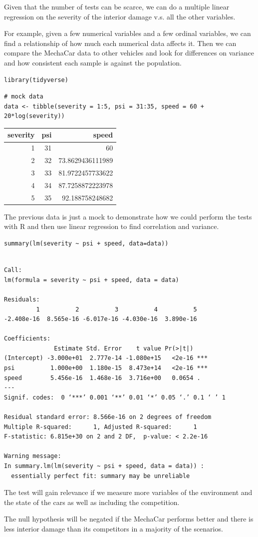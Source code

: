 \documentclass[11pt]{article}
\begin{document}
Given that the number of tests can be scarce, we can do a multiple linear regression on the severity of the interior damage v.s. all the other variables.

For example, given a few numerical variables and a few ordinal variables, we can find a relationship of how much each numerical data affects it. Then we can compare the MechaCar data to other vehicles and look for differences on variance and how consistent each sample is against the population.

\begin{verbatim}
library(tidyverse)
\end{verbatim}

\begin{verbatim}
# mock data
data <- tibble(severity = 1:5, psi = 31:35, speed = 60 + 20*log(severity))
\end{verbatim}

\begin{org}
\begin{center}
\begin{tabular}{rrr}
severity & psi & speed\\
\hline
1 & 31 & 60\\
2 & 32 & 73.8629436111989\\
3 & 33 & 81.9722457733622\\
4 & 34 & 87.7258872223978\\
5 & 35 & 92.188758248682\\
\end{tabular}
\end{center}
\end{org}

The previous data is just a mock to demonstrate how we could perform the tests with R and then use linear regression to find correlation and variance.

\begin{verbatim}
summary(lm(severity ~ psi + speed, data=data))
\end{verbatim}

\begin{verbatim}

Call:
lm(formula = severity ~ psi + speed, data = data)

Residuals:
         1          2          3          4          5
-2.408e-16  8.565e-16 -6.017e-16 -4.030e-16  3.890e-16

Coefficients:
              Estimate Std. Error    t value Pr(>|t|)
(Intercept) -3.000e+01  2.777e-14 -1.080e+15   <2e-16 ***
psi          1.000e+00  1.180e-15  8.473e+14   <2e-16 ***
speed        5.456e-16  1.468e-16  3.716e+00   0.0654 .
---
Signif. codes:  0 ‘***’ 0.001 ‘**’ 0.01 ‘*’ 0.05 ‘.’ 0.1 ‘ ’ 1

Residual standard error: 8.566e-16 on 2 degrees of freedom
Multiple R-squared:      1,	Adjusted R-squared:      1
F-statistic: 6.815e+30 on 2 and 2 DF,  p-value: < 2.2e-16

Warning message:
In summary.lm(lm(severity ~ psi + speed, data = data)) :
  essentially perfect fit: summary may be unreliable
\end{verbatim}

The test will gain relevance if we measure more variables of the environment and the state of the cars as well as including the competition.

The null hypothesis will be negated if the MechaCar performs better and there is less interior damage than its competitors in a majority of the scenarios.
\end{document}
